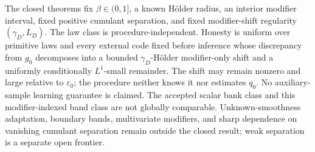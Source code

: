 The closed theorems fix \(\beta\in(0,1]\), a known Hölder radius, an interior modifier interval, fixed positive cumulant separation, and fixed modifier-shift regularity \((\gamma_D,L_D)\).  The law class is procedure-independent.  Honesty is uniform over primitive laws and every external code fixed before inference whose discrepancy from \(g_0\) decomposes into a bounded \(\gamma_D\)-Hölder modifier-only shift and a uniformly conditionally \(L^1\)-small remainder.  The shift may remain nonzero and large relative to \(\varepsilon_0\); the procedure neither knows it nor estimates \(q_0\).  No auxiliary-sample learning guarantee is claimed.  The accepted scalar bank class and this modifier-indexed band class are not globally comparable.  Unknown-smoothness adaptation, boundary bands, multivariate modifiers, and sharp dependence on vanishing cumulant separation remain outside the closed result; weak separation is a separate open frontier.